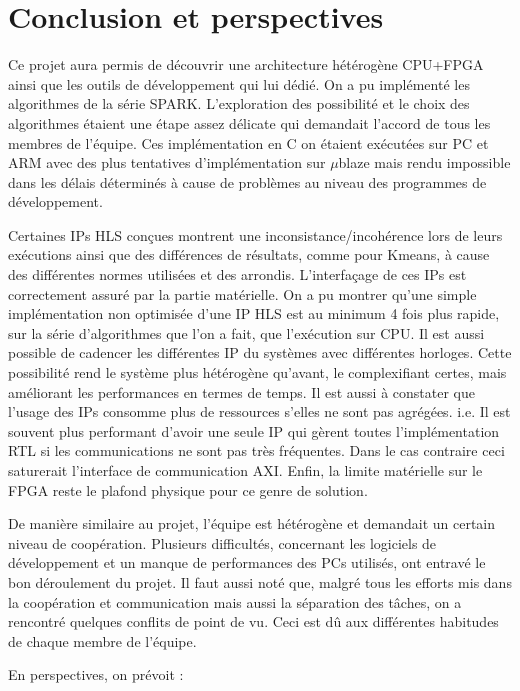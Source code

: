\documentclass[12pt,a4paper]{article}
\begin{document}
\section{Conclusion et perspectives}
Ce projet aura permis de découvrir une architecture hétérogène CPU+FPGA ainsi que les outils de développement qui lui dédié. On a pu implémenté les algorithmes de la série SPARK. L'exploration des possibilité et le choix des algorithmes étaient une étape assez délicate qui demandait l'accord de tous les membres de l'équipe. Ces implémentation en C on étaient exécutées sur PC et ARM avec des plus tentatives d'implémentation sur $\mu$blaze mais rendu impossible dans les délais déterminés à cause de problèmes au niveau des programmes de développement.

Certaines IPs HLS conçues montrent une inconsistance/incohérence lors de leurs exécutions ainsi que des différences de résultats, comme pour Kmeans, à cause des différentes normes utilisées et des arrondis. L'interfaçage de ces IPs est correctement assuré par la partie matérielle. On a pu montrer qu'une simple implémentation non optimisée d'une IP HLS est au minimum 4 fois plus rapide, sur la série d'algorithmes que l'on a fait, que l'exécution sur CPU. Il est aussi possible de cadencer les différentes IP du systèmes avec différentes horloges. Cette possibilité rend le système plus hétérogène qu'avant, le complexifiant certes, mais améliorant les performances en termes de temps. Il est aussi à constater que l'usage des IPs consomme plus de ressources s'elles ne sont pas agrégées. i.e. Il est souvent plus performant d'avoir une seule IP qui gèrent toutes l'implémentation RTL si les communications ne sont pas très fréquentes. Dans le cas contraire ceci saturerait l'interface de communication AXI. Enfin, la limite matérielle sur le FPGA reste le plafond physique pour ce genre de solution.


De manière similaire au projet, l'équipe est hétérogène et demandait un certain niveau de coopération. Plusieurs difficultés, concernant les logiciels de développement et un manque de performances des PCs utilisés, ont entravé le bon déroulement du projet. Il faut aussi noté que, malgré tous les efforts mis dans la coopération et communication mais aussi la séparation des tâches, on a rencontré quelques conflits de point de vu. Ceci est dû aux différentes habitudes de chaque membre de l'équipe.


En perspectives, on prévoit :
\end{document}
